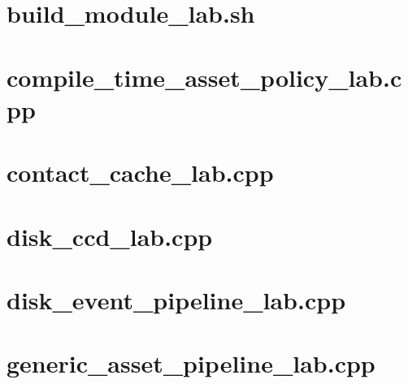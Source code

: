 \documentclass[11pt,twoside,openany]{book}
\begin{document}
\section*{build\_module\_lab.sh}
\hypertarget{source-file-f5eb017280bb6b2ae6b1475d}{}
\label{attachmentstart:source-file-f5eb017280bb6b2ae6b1475d}
\section*{compile\_time\_asset\_policy\_lab.cpp}
\hypertarget{source-file-830b13449e1c6505af693753}{}
\label{attachmentstart:source-file-830b13449e1c6505af693753}
\section*{contact\_cache\_lab.cpp}
\hypertarget{source-file-887bbb1db2a031cbbf1eee43}{}
\label{attachmentstart:source-file-887bbb1db2a031cbbf1eee43}
\section*{disk\_ccd\_lab.cpp}
\hypertarget{source-file-ad26f703e8f150d27a72bf93}{}
\label{attachmentstart:source-file-ad26f703e8f150d27a72bf93}
\section*{disk\_event\_pipeline\_lab.cpp}
\hypertarget{source-file-a5db53514d74ae247b4ac42f}{}
\label{attachmentstart:source-file-a5db53514d74ae247b4ac42f}
\section*{generic\_asset\_pipeline\_lab.cpp}
\hypertarget{source-file-8aedc3fdcd10c91971507448}{}
\label{attachmentstart:source-file-8aedc3fdcd10c91971507448}
\end{document}
